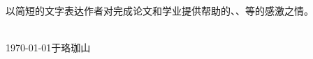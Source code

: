 
\acknowledgements


以简短的文字表达作者对完成论文和学业提供帮助的、、等的感激之情。


\begin{signature}
  \blind{} \\
  \today 于珞珈山
\end{signature}